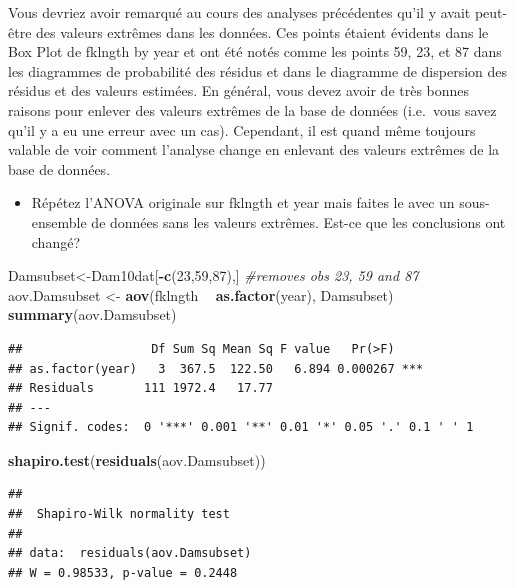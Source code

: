 \documentclass[12pt,]{book}
\newenvironment{Shaded}{\begin{snugshade}}{\end{snugshade}}
\newcommand{\CommentTok}[1]{\textcolor[rgb]{0.37,0.37,0.37}{\textit{#1}}}
\newcommand{\DecValTok}[1]{\textcolor[rgb]{0.06,0.06,0.06}{#1}}
\newcommand{\KeywordTok}[1]{\textcolor[rgb]{0.27,0.27,0.27}{\textbf{#1}}}
\newcommand{\NormalTok}[1]{#1}
\newcommand{\OperatorTok}[1]{\textcolor[rgb]{0.43,0.43,0.43}{\textbf{#1}}}
\newcommand{\StringTok}[1]{\textcolor[rgb]{0.5,0.5,0.5}{#1}}
\providecommand{\tightlist}{%
  \setlength{\itemsep}{0pt}\setlength{\parskip}{0pt}}
\begin{document}
Vous devriez avoir remarqué au cours des analyses précédentes qu'il y avait peut-être des valeurs extrêmes dans les données. Ces points étaient évidents dans le Box Plot de fklngth by year et ont été notés comme les points 59, 23, et 87 dans les diagrammes de probabilité des résidus et dans le diagramme de dispersion des résidus et des valeurs estimées. En général, vous devez avoir de très bonnes raisons pour enlever des valeurs extrêmes de la base de données (i.e.~vous savez qu'il y a eu une erreur avec un cas). Cependant, il est quand même toujours valable de voir comment l'analyse change en enlevant des valeurs extrêmes de la base de données.

\begin{itemize}
\tightlist
\item
  Répétez l'ANOVA originale sur fklngth et year mais faites le avec un sous-ensemble de données sans les valeurs extrêmes. Est-ce que les conclusions ont changé?
\end{itemize}

\begin{Shaded}
\begin{Highlighting}[]
\NormalTok{Damsubset<-Dam10dat[}\OperatorTok{-}\KeywordTok{c}\NormalTok{(}\DecValTok{23}\NormalTok{,}\DecValTok{59}\NormalTok{,}\DecValTok{87}\NormalTok{),] }\CommentTok{#removes obs 23, 59 and 87}
\NormalTok{aov.Damsubset <-}\StringTok{ }\KeywordTok{aov}\NormalTok{(fklngth }\OperatorTok{~}\StringTok{ }\KeywordTok{as.factor}\NormalTok{(year), Damsubset)}
\KeywordTok{summary}\NormalTok{(aov.Damsubset)}
\end{Highlighting}
\end{Shaded}

\begin{verbatim}
##                  Df Sum Sq Mean Sq F value   Pr(>F)    
## as.factor(year)   3  367.5  122.50   6.894 0.000267 ***
## Residuals       111 1972.4   17.77                     
## ---
## Signif. codes:  0 '***' 0.001 '**' 0.01 '*' 0.05 '.' 0.1 ' ' 1
\end{verbatim}

\begin{Shaded}
\begin{Highlighting}[]
\KeywordTok{shapiro.test}\NormalTok{(}\KeywordTok{residuals}\NormalTok{(aov.Damsubset))}
\end{Highlighting}
\end{Shaded}

\begin{verbatim}
## 
## 	Shapiro-Wilk normality test
## 
## data:  residuals(aov.Damsubset)
## W = 0.98533, p-value = 0.2448
\end{verbatim}
\end{document}
